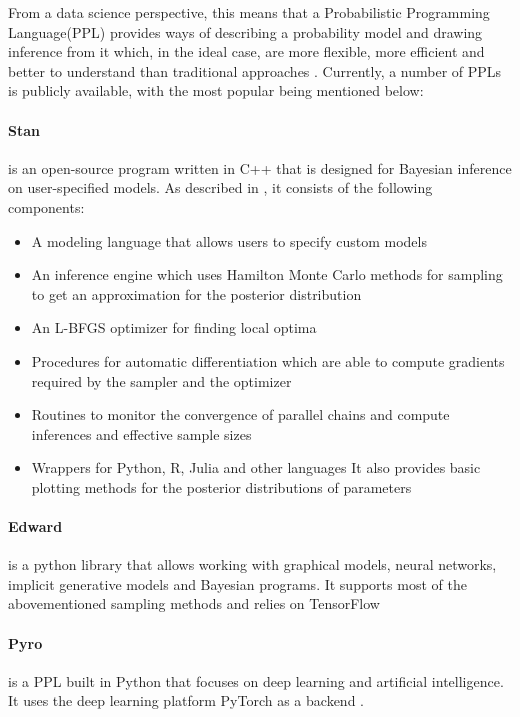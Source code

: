 \documentclass{article}
\begin{document}
From a data science perspective, this means that a Probabilistic Programming Language(PPL) provides ways of describing a probability model and drawing inference from it which, in the ideal case, are more flexible, more efficient and better to understand than traditional approaches \cite{Hardesty2015}. Currently, a number of PPLs is publicly available, with the most popular being mentioned below:
\paragraph{Stan}
is an open-source program written in C++ that is designed for Bayesian inference on user-specified models. As described in \cite{Gelman_2015}, it consists of the following components:
\begin{itemize}
	\item A modeling language that allows users to specify custom models
	\item An inference engine which uses Hamilton Monte Carlo methods for sampling to get an approximation for the posterior distribution
	\item An L-BFGS optimizer for finding local optima
	\item Procedures for automatic differentiation which are able to compute gradients required by the sampler and the optimizer
	\item Routines to monitor the convergence of parallel chains and compute inferences and effective sample sizes
	\item Wrappers for Python, R, Julia and other languages
It also provides basic plotting methods for the posterior distributions of parameters
\end{itemize}
\paragraph{Edward}
is a python library that allows working with graphical models, neural networks, implicit generative models and Bayesian programs. It supports most of the abovementioned sampling methods and relies on TensorFlow \cite{tran2016edward}
\paragraph{Pyro}
is a PPL built in Python that focuses on deep learning and artificial intelligence. It uses the deep learning platform PyTorch as a backend \cite{bingham2018pyro}.
\end{document}
